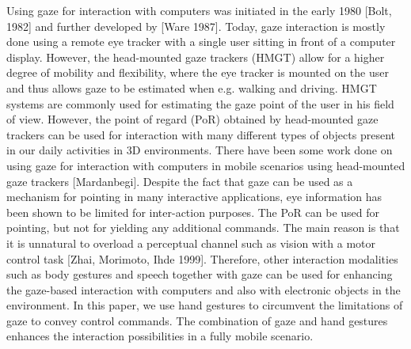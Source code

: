 \documentclass[jou,a4paper,notxfonts]{apa}
\begin{document}
Using gaze for interaction with computers was initiated in the early 1980 [Bolt, 1982] and further developed by [Ware
1987]. Today, gaze interaction is mostly done using a remote eye tracker with a single user sitting in front of a
computer display. However, the head-mounted gaze trackers (HMGT) allow for a higher degree of mobility and flexibility,
where the eye tracker is mounted on the user and thus allows gaze to be estimated when e.g. walking and driving. HMGT
systems are commonly used for estimating the gaze point of the user in his field of view. However, the point of regard
(PoR) obtained by head-mounted gaze trackers can be used for interaction with many different types of objects present in
our daily activities in 3D environments. There have been some work done on using gaze for interaction with computers in
mobile scenarios using head-mounted gaze trackers [Mardanbegi]. Despite the fact that gaze can be used as a mechanism
for pointing in many interactive applications, eye information has been shown to be limited for inter-action purposes.
The PoR can be used for pointing, but not for yielding any additional commands. The main reason is that it is unnatural
to overload a perceptual channel such as vision with a motor control task [Zhai, Morimoto, Ihde 1999].
Therefore, other interaction modalities such as body gestures and speech together with gaze can be used for enhancing
the gaze-based interaction with computers and also with electronic objects in the environment.  In this paper, we use
hand gestures to circumvent the limitations of gaze to convey control commands. The combination of gaze and hand
gestures enhances the interaction possibilities in a fully mobile scenario.
 
\end{document}
